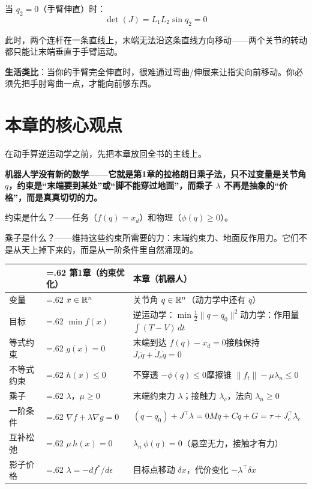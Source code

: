 \begin{example}[伸直位形的奇异性]
当 $q_2 = 0$（手臂伸直）时：
\[
\det(J) = L_1 L_2 \sin q_2 = 0
\]

此时，两个连杆在一条直线上，末端无法沿这条直线方向移动——两个关节的转动都只能让末端垂直于手臂运动。

\textbf{生活类比}：当你的手臂完全伸直时，很难通过弯曲/伸展来让指尖向前移动。你必须先把手肘弯曲一点，才能向前够东西。
\end{example}

\section{本章的核心观点}

在动手算逆运动学之前，先把本章放回全书的主线上。

\begin{tcolorbox}[colback=yellow!10, colframe=orange!80, title=核心观点]
\textbf{机器人学没有新的数学——它就是第1章的拉格朗日乘子法，只不过变量是关节角 $q$，约束是“末端要到某处”或“脚不能穿过地面”，而乘子 $\lambda$ 不再是抽象的“价格”，而是真真切切的力。}

约束是什么？——任务（$f(q) = x_d$）和物理（$\phi(q) \ge 0$）。

乘子是什么？——维持这些约束所需要的力：末端约束力、地面反作用力。它们不是从天上掉下来的，而是从一阶条件里自然涌现的。
\end{tcolorbox}

\begin{center}
\renewcommand{\arraystretch}{1.4}
\small
\begin{tabularx}{\linewidth}{l>{\hsize=.62\hsize}X>{\hsize=1.38\hsize}X}
\toprule
 & \textbf{第1章（约束优化）} & \textbf{本章（机器人）} \\
\midrule
变量 & $x \in \mathbb{R}^n$ & 关节角 $q \in \mathbb{R}^n$（动力学中还有 $\ddot{q}$） \\
目标 & $\min f(x)$ & 逆运动学：$\min \tfrac{1}{2}\|q - q_0\|^2$\newline 动力学：作用量 $\int (T - V)\,dt$ \\
等式约束 & $g(x) = 0$ & 末端到达 $f(q) - x_d = 0$\newline 接触保持 $J_c \ddot{q} + \dot{J}_c \dot{q} = 0$ \\
不等式约束 & $h(x) \le 0$ & 不穿透 $-\phi(q) \le 0$\newline 摩擦锥 $\|f_t\| - \mu \lambda_n \le 0$ \\
乘子 & $\lambda$，$\mu \ge 0$ & 末端约束力 $\lambda$；接触力 $\lambda_c$，法向 $\lambda_n \ge 0$ \\
一阶条件 & $\nabla f + \lambda \nabla g = 0$ & $(q - q_0) + J^\top \lambda = 0$\newline $M\ddot{q} + C\dot{q} + G = \tau + J_c^\top \lambda_c$ \\
互补松弛 & $\mu\, h(x) = 0$ & $\lambda_n\, \phi(q) = 0$（悬空无力，接触才有力） \\
影子价格 & $\lambda = -df^*/d\epsilon$ & 目标点移动 $\delta x$，代价变化 $-\lambda^\top \delta x$ \\
\bottomrule
\end{tabularx}
\end{center}

